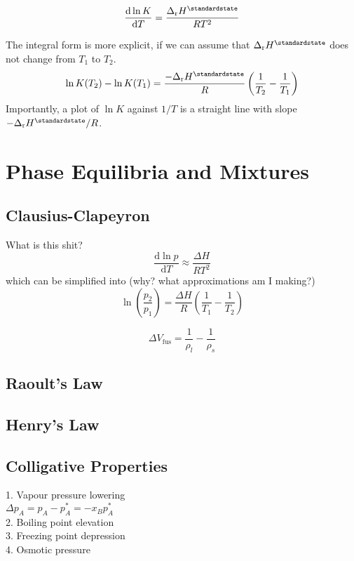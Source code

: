 \begin{equation*}
    \odv{\ln K}{T} = \frac{\Delta_{\mathrm{r}}H^\standardstate}{RT^2}
\end{equation*}

The integral form is more explicit, if we can assume that $\Delta_{\mathrm{r}}H^\standardstate$ does not change from $T_1$ to $T_2$.
\begin{equation*}
    \ln K (T_2) - \ln K (T_1) = \frac{-\Delta_{\mathrm{r}}H^\standardstate}{R} \left(\frac{1}{T_2} - \frac{1}{T_1}\right)
\end{equation*}
Importantly, a plot of $\ln K$ against $1/T$ is a straight line with slope $-\Delta_{\mathrm{r}}H^\standardstate / R$.

\section{Phase Equilibria and Mixtures}

\subsection*{Clausius-Clapeyron}
What is this shit?
\begin{equation*}
    \frac{\mathrm{d}\ln p}{\mathrm{d}T} \approx \frac{\Delta H}{RT^2}
\end{equation*}
which can be simplified into (why? what approximations am I making?)
\begin{equation*}
    \ln\left(\frac{p_2}{p_1}\right) = \frac{\Delta H}{R}\left(\frac{1}{T_1} - \frac{1}{T_2}\right)
\end{equation*}

\begin{equation*}
    \Delta V_{\mathrm{fus}} = \frac{1}{\rho_l} - \frac{1}{\rho_s}
\end{equation*}

\subsection*{Raoult's Law}

\subsection*{Henry's Law}

\subsection*{Colligative Properties}
1. Vapour pressure lowering \\
$\Delta p_A = p_A - p^{*}_{A} = -x_B p^*_A$ \\
2. Boiling point elevation \\
3. Freezing point depression \\
4. Osmotic pressure \\

